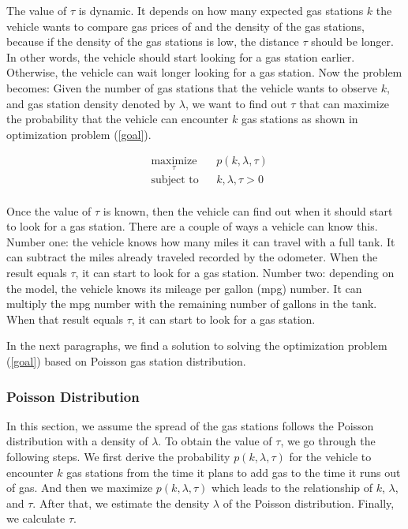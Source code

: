 \documentclass[conference]{IEEEtran}
\theoremstyle{definition}
\begin{document}
The value of $\tau$ is dynamic. It depends on how many expected gas stations $k$ the vehicle wants to compare gas prices of and the density of the gas stations, because if the density of the gas stations is low, the distance $\tau$ should be longer. In other words, the vehicle should start looking for a gas station earlier. Otherwise, the vehicle can wait longer looking for a gas station. Now the problem becomes:   Given the number of gas stations that the vehicle wants to observe $k$, and gas station density denoted by $\lambda$, we want to find out $\tau$ that can maximize the probability that the vehicle can encounter $k$ gas stations as shown in optimization problem (\ref{goal}).

\begin{equation} \label{goal}
\begin{aligned}
   & \underset{\tau}{\text{maximize}}
   & &  p(k, \lambda, \tau) \\
   & \text{subject to} & & k, \lambda, \tau >0    \\
\end{aligned}
\end{equation}

Once the value of $\tau$ is known, then the vehicle can find out when it should start to look for a gas station. There are a couple of ways a vehicle can know this. Number one: the vehicle knows how many miles it can travel with a full tank. It can subtract the miles already traveled recorded by the odometer. When the result equals $\tau$, it can start to look for a gas station. Number two: depending on the model, the vehicle knows its mileage per gallon (mpg) number. It can multiply the mpg number with the remaining number of gallons in the tank. When that result equals $\tau$, it can start to look for a gas station.

In the next paragraphs, we find a solution to solving the optimization problem (\ref{goal}) based on Poisson gas station distribution.

\subsubsection{Poisson Distribution}
In this section, we assume the spread of the gas stations follows the Poisson distribution with a density of $\lambda$. To obtain the value of $\tau$, we go through the following steps. We first derive the probability $p(k, \lambda, \tau)$ for the vehicle to encounter $k$ gas stations from the time it plans to add gas to the time it runs out of gas. And then we maximize $p(k, \lambda, \tau)$ which leads to the relationship of $k$, $\lambda$, and $\tau$. After that, we estimate the density $\lambda$ of the Poisson distribution. Finally, we  calculate $\tau$.
\end{document}
